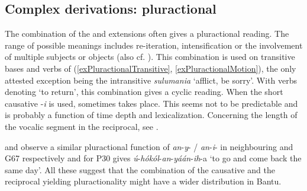 \subsection{Complex derivations: pluractional}\label{Pluractional}
The combination of the  and  extensions often gives a pluractional reading. The range of possible meanings includes re-iteration, intensification or the involvement of multiple subjects or objects (also cf. \citealt[79]{SchumannK1899}). This combination is used on transitive bases and verbs of  (\ref{exPluractionalTransitive}, \ref{exPluractionalMotion}), the only attested exception being the intransitive \textit{sulumania} `afflict, be sorry'. With verbs denoting `to return', this combination gives a cyclic reading. When the short causative -\textit{i} is used, sometimes  takes place. This seems not to be predictable and is probably a function of time depth and lexicalization. Concerning the length of the vocalic segment in the reciprocal, see .


\citet[86]{BotneR2008} and \citet{GrayMS} observe a similar pluractional function of \mbox{\textit{an}-\textit{y}-} / \mbox{\textit{an}-\textit{i}-} in neighbouring  and  G67 respectively and \citet[557]{KisseberthC2003} for  P30 gives \textit{ú}-\textit{hókól}-\textit{an}-\textit{yáán}-\textit{ih}-a `to go and come back the same day'. All these suggest that the combination of the causative and the reciprocal yielding pluractionality might have a wider distribution in Bantu. 

